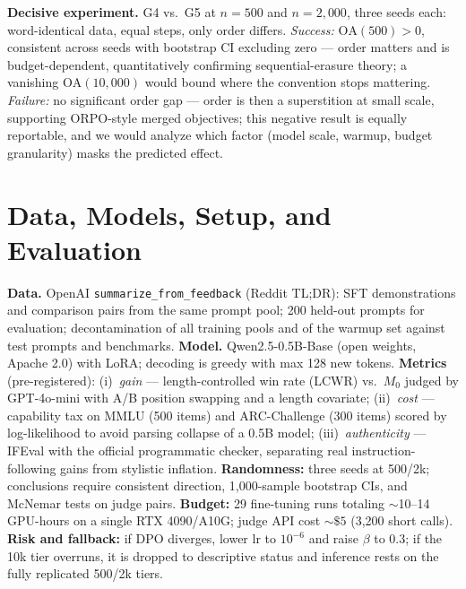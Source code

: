 \documentclass[11pt]{article}
\begin{document}
\textbf{Decisive experiment.} G4 vs.\ G5 at $n=500$ and $n=2{,}000$, three seeds each: word-identical data, equal steps, only order differs. \emph{Success:} $\mathrm{OA}(500)>0$, consistent across seeds with bootstrap CI excluding zero --- order matters and is budget-dependent, quantitatively confirming sequential-erasure theory; a vanishing $\mathrm{OA}(10{,}000)$ would bound where the convention stops mattering. \emph{Failure:} no significant order gap --- order is then a superstition at small scale, supporting ORPO-style merged objectives; this negative result is equally reportable, and we would analyze which factor (model scale, warmup, budget granularity) masks the predicted effect.

\section{Data, Models, Setup, and Evaluation}

\textbf{Data.} OpenAI \texttt{summarize\_from\_feedback} (Reddit TL;DR): SFT demonstrations and comparison pairs from the same prompt pool; 200 held-out prompts for evaluation; decontamination of all training pools and of the warmup set against test prompts and benchmarks. \textbf{Model.} Qwen2.5-0.5B-Base (open weights, Apache 2.0) with LoRA; decoding is greedy with max 128 new tokens. \textbf{Metrics} (pre-registered): (i)~\emph{gain} --- length-controlled win rate (LCWR) vs.\ $M_0$ judged by GPT-4o-mini with A/B position swapping and a length covariate; (ii)~\emph{cost} --- capability tax on MMLU (500 items) and ARC-Challenge (300 items) scored by log-likelihood to avoid parsing collapse of a 0.5B model; (iii)~\emph{authenticity} --- IFEval with the official programmatic checker, separating real instruction-following gains from stylistic inflation. \textbf{Randomness:} three seeds at 500/2k; conclusions require consistent direction, 1{,}000-sample bootstrap CIs, and McNemar tests on judge pairs. \textbf{Budget:} 29 fine-tuning runs totaling $\sim$10--14 GPU-hours on a single RTX 4090/A10G; judge API cost $\sim\$5$ (3{,}200 short calls). \textbf{Risk and fallback:} if DPO diverges, lower lr to $10^{-6}$ and raise $\beta$ to 0.3; if the 10k tier overruns, it is dropped to descriptive status and inference rests on the fully replicated 500/2k tiers.
\end{document}
